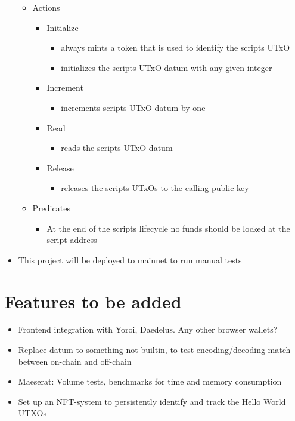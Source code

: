 \documentclass{article}
\begin{document}
\begin{itemize}
  \begin{itemize}
    \item Actions
    \begin{itemize}
      \item Initialize
        \begin{itemize}
          \item always mints a token that is used to identify the scripts UTxO
          \item initializes the scripts UTxO datum with any given integer
        \end{itemize}
      \item Increment
        \begin{itemize}
          \item increments scripts UTxO datum by one
        \end{itemize}
      \item Read
        \begin{itemize}
          \item reads the scripts UTxO datum
        \end{itemize}
      \item Release
        \begin{itemize}
          \item releases the scripts UTxOs to the calling public key
        \end{itemize}
    \end{itemize}
    \item Predicates
      \begin{itemize}
        \item At the end of the scripts lifecycle no funds should be locked at the script address
      \end{itemize}
  \end {itemize}
  \item This project will be deployed to mainnet to run manual tests
\end{itemize}

\section{Features to be added}

\begin{itemize}
  \item Frontend integration with Yoroi, Daedelus. Any other browser wallets?
  \item Replace datum to something not-builtin, to test encoding/decoding match
    between on-chain and off-chain
  \item Maeserat: Volume tests, benchmarks for time and memory consumption
  \item Set up an NFT-system to persistently identify and track the Hello World
    UTXOs
\end{itemize}
\end{document}
